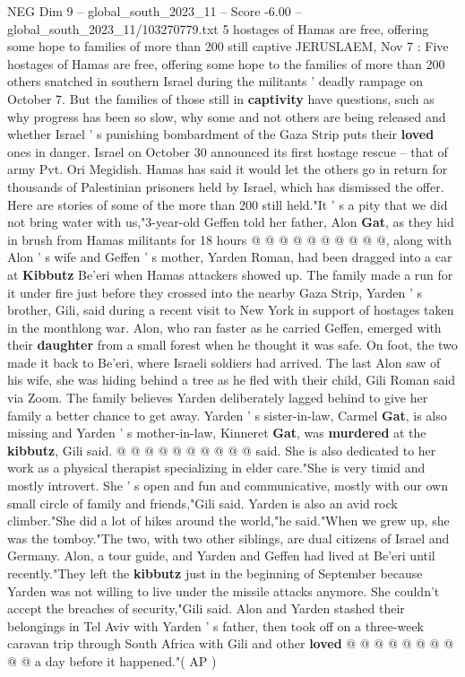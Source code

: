 \begin{textsample}{NEG Dim 9 – global\_south\_2023\_11 – Score -6.00 – global\_south\_2023\_11/103270779.txt}  \label{ex:f9_neg_313}
5 hostages of Hamas are free, offering some hope to families of more than 200 still captive JERUSLAEM, Nov 7 : Five hostages of Hamas are free, offering some hope to the families of more than 200 others snatched in southern Israel during the militants ' deadly rampage on October 7.
But the families of those still in \textbf{captivity} have questions, such as why progress has been so slow, why some and not others are being released and whether Israel ' s punishing bombardment of the Gaza Strip puts their \textbf{loved} ones in danger.
Israel on October 30 announced its first hostage rescue -- that of army Pvt.
Ori Megidish.
Hamas has said it would let the others go in return for thousands of Palestinian prisoners held by Israel, which has dismissed the offer.
Here are stories of some of the more than 200 still held."It ' s a pity that we did not bring water with us,"3-year-old Geffen told her father, Alon \textbf{Gat}, as they hid in brush from Hamas militants for 18 hours @ @ @ @ @ @ @ @ @ @, along with Alon ' s wife and Geffen ' s mother, Yarden Roman, had been dragged into a car at \textbf{Kibbutz} Be'eri when Hamas attackers showed up.
The family made a run for it under fire just before they crossed into the nearby Gaza Strip, Yarden ' s brother, Gili, said during a recent visit to New York in support of hostages taken in the monthlong war.
Alon, who ran faster as he carried Geffen, emerged with their \textbf{daughter} from a small forest when he thought it was safe.
On foot, the two made it back to Be'eri, where Israeli soldiers had arrived.
The last Alon saw of his wife, she was hiding behind a tree as he fled with their child, Gili Roman said via Zoom.
The family believes Yarden deliberately lagged behind to give her family a better chance to get away.
Yarden ' s sister-in-law, Carmel \textbf{Gat}, is also missing and Yarden ' s mother-in-law, Kinneret \textbf{Gat}, was \textbf{murdered} at the \textbf{kibbutz}, Gili said. @ @ @ @ @ @ @ @ @ @ said.
She is also dedicated to her work as a physical therapist specializing in elder care."She is very timid and mostly introvert.
She ' s open and fun and communicative, mostly with our own small circle of family and friends,"Gili said.
Yarden is also an avid rock climber."She did a lot of hikes around the world,"he said."When we grew up, she was the tomboy."The two, with two other siblings, are dual citizens of Israel and Germany.
Alon, a tour guide, and Yarden and Geffen had lived at Be'eri until recently."They left the \textbf{kibbutz} just in the beginning of September because Yarden was not willing to live under the missile attacks anymore.
She couldn't accept the breaches of security,"Gili said.
Alon and Yarden stashed their belongings in Tel Aviv with Yarden ' s father, then took off on a three-week caravan trip through South Africa with Gili and other \textbf{loved} @ @ @ @ @ @ @ @ @ @ a day before it happened."( AP )

\end{textsample}
